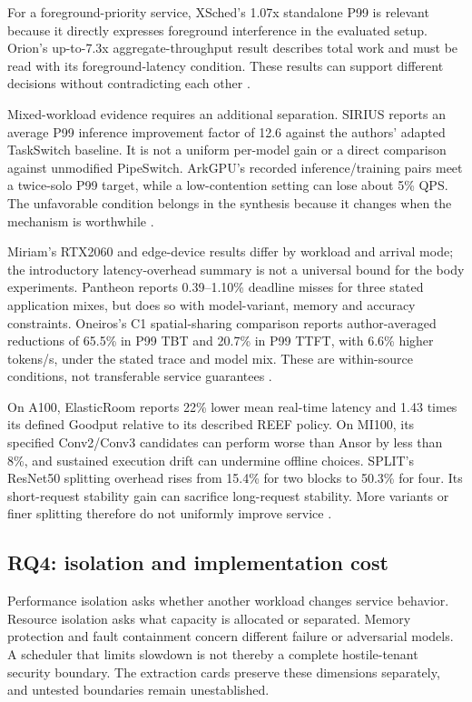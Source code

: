 For a foreground-priority service, XSched's 1.07x standalone P99 is relevant because it directly expresses foreground interference in the evaluated setup. Orion's up-to-7.3x aggregate-throughput result describes total work and must be read with its foreground-latency condition. These results can support different decisions without contradicting each other \cite{P007,P015}.

Mixed-workload evidence requires an additional separation. SIRIUS reports an average P99 inference improvement factor of 12.6 against the authors' adapted TaskSwitch baseline. It is not a uniform per-model gain or a direct comparison against unmodified PipeSwitch. ArkGPU's recorded inference/training pairs meet a twice-solo P99 target, while a low-contention setting can lose about 5\% QPS. The unfavorable condition belongs in the synthesis because it changes when the mechanism is worthwhile \cite{P010,P019}.

Miriam's RTX2060 and edge-device results differ by workload and arrival mode; the introductory latency-overhead summary is not a universal bound for the body experiments. Pantheon reports 0.39--1.10\% deadline misses for three stated application mixes, but does so with model-variant, memory and accuracy constraints. Oneiros's C1 spatial-sharing comparison reports author-averaged reductions of 65.5\% in P99 TBT and 20.7\% in P99 TTFT, with 6.6\% higher tokens/s, under the stated trace and model mix. These are within-source conditions, not transferable service guarantees \cite{s023,s025,s026}.

On A100, ElasticRoom reports 22\% lower mean real-time latency and 1.43 times its defined Goodput relative to its described REEF policy. On MI100, its specified Conv2/Conv3 candidates can perform worse than Ansor by less than 8\%, and sustained execution drift can undermine offline choices. SPLIT's ResNet50 splitting overhead rises from 15.4\% for two blocks to 50.3\% for four. Its short-request stability gain can sacrifice long-request stability. More variants or finer splitting therefore do not uniformly improve service \cite{s028,s029}.

\subsection{RQ4: isolation and implementation cost}
Performance isolation asks whether another workload changes service behavior. Resource isolation asks what capacity is allocated or separated. Memory protection and fault containment concern different failure or adversarial models. A scheduler that limits slowdown is not thereby a complete hostile-tenant security boundary. The extraction cards preserve these dimensions separately, and untested boundaries remain unestablished.


